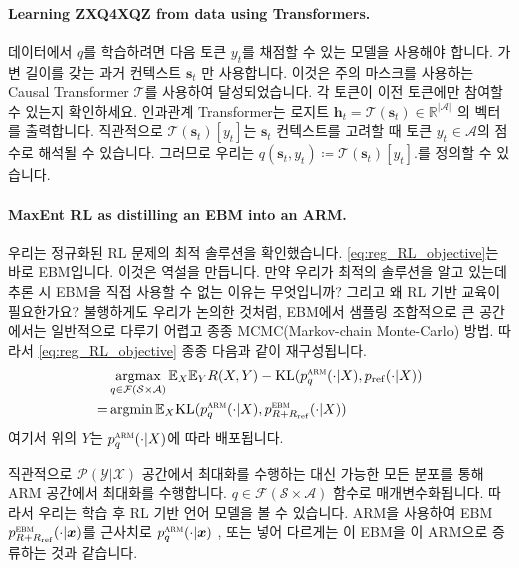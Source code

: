 \documentclass{article}
\def\h{{\bm{h}}}
\def\s{{\bm{s}}}
\def\x{{\bm{x}}}
\def\RR{{\mathbb{R}}}
\def\EE{{\mathbb{E}}}
\def\cA{{\mathcal{A}}}
\def\cF{{\mathcal{F}}}
\def\cP{{\mathcal{P}}}
\def\cS{{\mathcal{S}}}
\def\cT{{\mathcal{T}}}
\def\cX{{\mathcal{X}}}
\def\cY{{\mathcal{Y}}}
\def\arm{{\textsc{arm}}}
\def\ebm{{\textsc{ebm}}}
\def\augvoc{\cA}
\def\pref{p_{\mathrm{ref}}}
\DeclareMathOperator*{\argmax}{argmax}
\DeclareMathOperator*{\argmin}{argmin}
\begin{document}
 \paragraph{Learning  ZXQ4XQZ  from data using Transformers.}

데이터에서 $q$를 학습하려면 다음 토큰 $y_t$를 채점할 수 있는 모델을 사용해야 합니다. 
가변 길이를 갖는 과거 컨텍스트 $\s_t$ 만 사용합니다.  이것은
주의 마스크를 사용하는 Causal Transformer $\cT$를 사용하여 달성되었습니다.
각 토큰이 이전 토큰에만 참여할 수 있는지 확인하세요.  인과관계
Transformer는 로지트 $\h_t = \cT(\s_t) \in \RR^{|\cA|}$ 의 벡터를 출력합니다.
직관적으로 $\cT(\s_t)[y_t]$는 $\s_t$ 컨텍스트를 고려할 때 토큰 $y_t \in
\cA$의 점수로 해석될 수 있습니다.  그러므로 우리는 $q(\s_t, y_t) \coloneqq
\cT(\s_t)[y_t].$를 정의할 수 있습니다.

\paragraph{MaxEnt RL as distilling an EBM into an ARM.}

우리는 정규화된 RL 문제의 최적 솔루션을 확인했습니다.
 \eqref{eq:reg_RL_objective}는 바로 EBM입니다.  이것은 역설을 만듭니다. 만약 우리가
최적의 솔루션을 알고 있는데 추론 시 EBM을 직접 사용할 수 없는 이유는 무엇입니까?
그리고 왜 RL 기반 교육이 필요한가요? 불행하게도 우리가 논의한 것처럼,
EBM에서 샘플링
조합적으로 큰 공간에서는 일반적으로 다루기 어렵고 종종
MCMC(Markov-chain Monte-Carlo) 방법. 따라서 \eqref{eq:reg_RL_objective} 
종종 다음과 같이 재구성됩니다.
 \begin{equation} 
 \begin{aligned} 
& \argmax _{q \in \cF ( \cS \times \augvoc )} 
 \EE _X \EE _Y R(X, Y) - \mathrm{KL} (p^ \arm _q( \cdot |X), \pref ( \cdot |X)) \\
=& \argmin \EE _X \mathrm{KL} (p^ \arm _q( \cdot |X), p^ \ebm _{R + R_{ \mathrm{ref} }}( \cdot |X))
 \end{aligned} 
 \end{equation} 
여기서 위의 $Y$는 $p^\arm_q(\cdot|X)$에 따라 배포됩니다.

직관적으로 $\cP(\cY|\cX)$ 공간에서 최대화를 수행하는 대신
가능한 모든 분포를 통해 ARM 공간에서 최대화를 수행합니다.
$q \in \cF(\cS \times \cA)$ 함수로 매개변수화됩니다.  
따라서 우리는 학습 후 RL 기반 언어 모델을 볼 수 있습니다.
ARM을 사용하여 EBM $p^\ebm_{R + R_\mathrm{ref}}(\cdot | \x)$를 근사치로
 $p^\arm_q(\cdot|\x)$ , 또는 넣어
다르게는 이 EBM을 이 ARM으로 증류하는 것과 같습니다.
\end{document}
